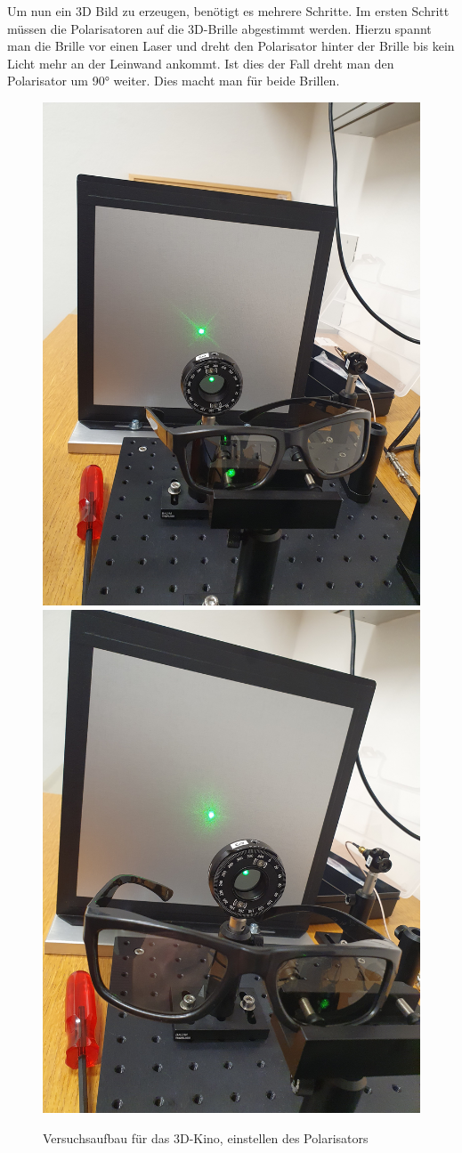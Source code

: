 \documentclass[12pt,a4paper,twoside]{article}
\begin{document}
\noindent
Um nun ein 3D Bild zu erzeugen, benötigt es mehrere Schritte. 
Im ersten Schritt müssen die Polarisatoren auf die 3D-Brille abgestimmt werden.
Hierzu spannt man die Brille vor einen Laser und dreht den Polarisator hinter der Brille bis kein Licht mehr an der Leinwand ankommt. 
Ist dies der Fall dreht man den Polarisator um 90° weiter. Dies macht man für beide Brillen. 

\begin{figure}[H]
    \centering
    \includegraphics[width=0.6\linewidth, angle=-90]{nudes/brille rechts.jpg}
    \includegraphics[width=0.6\linewidth, angle=-90]{nudes/brille links.jpg}
    \caption{Versuchsaufbau für das 3D-Kino, einstellen des Polarisators}
    \label{fig:3D Brille polarisator aufbau}
\end{figure}
\end{document}
